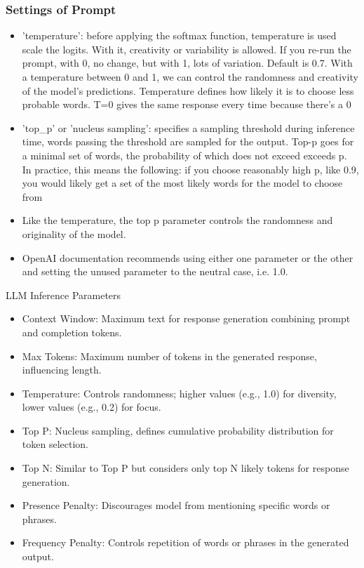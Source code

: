 \begin{frame}[fragile]\frametitle{Settings of Prompt}

\begin{itemize}
\item 'temperature':  before applying the softmax function, temperature is used scale the logits. With it, creativity or variability is allowed. If you re-run the prompt, with 0, no change, but with 1, lots of variation. Default is 0.7. With a temperature between 0 and 1, we can control the randomness and creativity of the model's predictions. Temperature defines how likely it is to choose less probable words. T=0 gives the same response every time because there's a 0%
\item 'top\_p' or 'nucleus sampling': specifies a sampling threshold during inference time, words passing the threshold are sampled for the output. Top-p goes for a minimal set of words, the probability of which does not exceed exceeds p. In practice, this means the following: if you choose reasonably high p, like 0.9, you would likely get a set of the most likely words for the model to choose from
\item Like the temperature, the top p parameter controls the randomness and originality of the model.
\item OpenAI documentation recommends using either one parameter or the other and setting the unused parameter to the neutral case, i.e. 1.0.
\end{itemize}
		
\end{frame}

\begin{frame}[fragile]{LLM Inference Parameters}
    \begin{itemize}
        \item Context Window: Maximum text for response generation combining prompt and completion tokens.
        \item Max Tokens: Maximum number of tokens in the generated response, influencing length.
        \item Temperature: Controls randomness; higher values (e.g., 1.0) for diversity, lower values (e.g., 0.2) for focus.
        \item Top P: Nucleus sampling, defines cumulative probability distribution for token selection.
        \item Top N: Similar to Top P but considers only top N likely tokens for response generation.
        \item Presence Penalty: Discourages model from mentioning specific words or phrases.
        \item Frequency Penalty: Controls repetition of words or phrases in the generated output.
    \end{itemize}
\end{frame}

